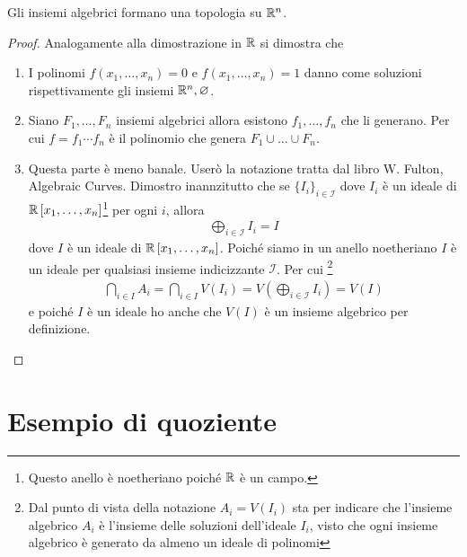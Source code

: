 \begin{theorem}
	Gli insiemi algebrici formano una topologia su $\mathbb{R}^n$.
\end{theorem}
\begin{proof}
	Analogamente alla dimostrazione in $\mathbb{R}$ si dimostra che
	\begin{enumerate}
		\item I polinomi $f(x_1, \dots, x_n) = 0$ e $f(x_1, \dots, x_n) = 1$ danno come soluzioni rispettivamente gli insiemi $\mathbb{R}^n, \varnothing$.
		\item Siano $F_1, \dots, F_n$ insiemi algebrici allora esistono $f_1, \dots, f_n$ che li generano. Per cui $f = f_1 \cdots f_n$ è il polinomio che genera $F_1 \cup \dots \cup F_n$.
		\item Questa parte è meno banale. Userò la notazione tratta dal libro W. Fulton, Algebraic Curves. Dimostro inannzitutto che se $\{I_i\}_{i \in \mathcal{I}}$ dove $I_i$ è un ideale di $\mathbb{R}\left[x_1, \dots, x_n\right]$\footnote{Questo anello è noetheriano poiché $\mathbb{R}$ è un campo.} per ogni $i$, allora 
		\begin{equation}
		\begin{aligned}
		\bigoplus_{i \in \mathcal{I}} I_i = I
		\end{aligned}
		\end{equation}
		dove $I$ è un ideale di $\mathbb{R}\left[x_1, \dots, x_n\right]$. Poiché siamo in un anello noetheriano $I$ è un ideale per qualsiasi insieme indicizzante $\mathcal{I}$. 
		Per cui \footnote{Dal punto di vista della notazione $A_i = V(I_i)$ sta per indicare che l'insieme algebrico $A_i$ è l'insieme delle soluzioni dell'ideale $I_i$, visto che ogni insieme algebrico è generato da almeno un ideale di polinomi}
		\begin{equation}
		\begin{aligned}
		\bigcap_{i \in I} A_i = \bigcap_{i \in I} V(I_i) = V\left(\bigoplus_{i \in \mathcal{I}} I_i\right) = V(I)
		\end{aligned}
		\end{equation}
		e poiché $I$ è un ideale ho anche che $V(I)$ è un insieme algebrico per definizione.
	\end{enumerate}	
\end{proof}

\section{Esempio di quoziente}

